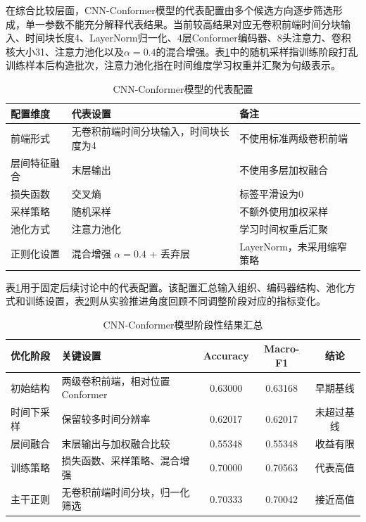 在综合比较层面，CNN-Conformer模型的代表配置由多个候选方向逐步筛选形成，单一参数不能充分解释代表结果。当前较高结果对应无卷积前端时间分块输入、时间块长度4、LayerNorm归一化、4层Conformer编码器、8头注意力、卷积核大小31、注意力池化以及$\alpha=0.4$的混合增强。表\ref{tab:chapter4_conformer_final}中的随机采样指训练阶段打乱训练样本后构造批次，注意力池化指在时间维度学习权重并汇聚为句级表示。

\begin{table}[!htbp]
    \centering
    \caption{CNN-Conformer模型的代表配置}
    \label{tab:chapter4_conformer_final}
    \footnotesize
    \setlength{\tabcolsep}{3pt}
    \renewcommand{\arraystretch}{0.9}
    \begin{tabularx}{0.95\textwidth}{p{}XX}
        \toprule
        配置维度 & 代表设置 & 备注 \\
        \midrule
        前端形式 & 无卷积前端时间分块输入，时间块长度为4 & 不使用标准两级卷积前端 \\
        层间特征融合 & 末层输出 & 不使用多层加权融合 \\
        损失函数 & 交叉熵 & 标签平滑设为0 \\
        采样策略 & 随机采样 & 不额外使用加权采样 \\
        池化方式 & 注意力池化 & 学习时间权重后汇聚 \\
        正则化设置 & 混合增强 $\alpha=0.4$ + 丢弃层 & LayerNorm，未采用缩窄策略 \\
        \bottomrule
    \end{tabularx}
\end{table}

表\ref{tab:chapter4_conformer_final}用于固定后续讨论中的代表配置。该配置汇总输入组织、编码器结构、池化方式和训练设置，表\ref{tab:chapter4_conformer_stage_results}则从实验推进角度回顾不同调整阶段对应的指标变化。

\begin{table}[!htbp]
    \centering
    \caption{CNN-Conformer模型阶段性结果汇总}
    \label{tab:chapter4_conformer_stage_results}
    \footnotesize
    \setlength{\tabcolsep}{2.5pt}
    \renewcommand{\arraystretch}{0.9}
    \begin{tabularx}{\textwidth}{p{}Xccc}
        \toprule
        优化阶段 & 关键设置 & Accuracy & Macro-F1 & 结论 \\
        \midrule
        初始结构 & 两级卷积前端，相对位置Conformer & 0.63000 & 0.63168 & 早期基线 \\
        时间下采样 & 保留较多时间分辨率 & 0.62017 & 0.62017 & 未超过基线 \\
        层间融合 & 末层输出与加权融合比较 & 0.55348 & 0.55348 & 收益有限 \\
        训练策略 & 损失函数、采样策略、混合增强 & 0.70000 & 0.70563 & 代表高值 \\
        主干正则 & 无卷积前端时间分块，归一化筛选 & 0.70333 & 0.70042 & 接近高值 \\
        \bottomrule
    \end{tabularx}
\end{table}

